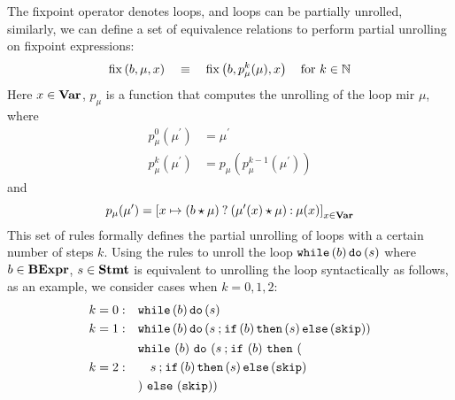 The fixpoint operator denotes loops, and loops can be partially unrolled,
similarly, we can define a set of equivalence relations to perform partial
unrolling on fixpoint expressions:
\begin{equation}
    \operatorname{\mathrm{fix}}\left({b, \mu, x}\right)
    \quad \equiv \quad
    \operatorname{\mathrm{fix}}\left({b, p_\mu^k(\mu), x}\right) \quad \text{for $k \in \mathbb{N}$}
    \label{po:eq:unroll}
\end{equation}
Here $x \in \mathbf{Var}$, $p_\mu$ is a function that computes the unrolling
of the loop \gls{mir} $\mu$, where
\begin{align}
    p_\mu^0(\mu^\prime) &= \mu^\prime \\
    p_\mu^k(\mu^\prime) &= p_\mu(p_\mu^{k - 1}(\mu^\prime))
\end{align}
and 
\begin{equation}
    p_\mu(\mu^\prime) = {\left[
        x \mapsto ( b \mathbin{\star} \mu ) \mathbin{?}
            ( \mu^\prime(x) \mathbin{\star} \mu ) \mathbin{:} \mu(x)
    \right]}_{x \in \mathbf{Var}}
\end{equation}
This set of rules formally defines the partial unrolling of loops with
a certain number of steps $k$.  Using the rules to unroll the loop
$\texttt{while}\left(b\right)\texttt{do}\left(s\right)$ where $b \in \mathbf{BExpr}$, $s \in \mathbf{Stmt}$ is equivalent to
unrolling the loop syntactically as follows, as an example, we consider cases
when $k = 0, 1, 2$:
\begin{equation}
    \begin{aligned}
        k = 0: & \quad
        \texttt{while}\left(b\right)\texttt{do}\left(s\right) \\
        k = 1: & \quad
        \texttt{while}\left(b\right)\texttt{do}\left(s \mathbin{;} \texttt{if}\left(b\right)\texttt{then}\left(s\right) \texttt{else}\left(\mathtt{skip}\right)\right) \\
        k = 2: & \quad
        \begin{aligned}
            & \texttt{while}~(b)~\texttt{do}~(
                s \mathbin{;} \texttt{if}~(b)~\texttt{then}~( \\
            & \quad s \mathbin{;} \texttt{if}\left(b\right)\texttt{then}\left(s\right) \texttt{else}\left(\mathtt{skip}\right) \\
            & )~\texttt{else}~(\mathtt{skip}))
        \end{aligned}
    \end{aligned}
\end{equation}

